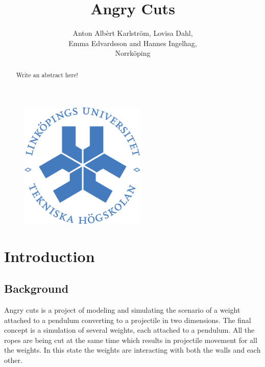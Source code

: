 \documentclass[a4paper,12pt,twoside,english]{article}
\title{Angry Cuts}
\author{Anton Alb\`{e}rt Karlstr\"{o}m, Lovisa Dahl, \\Emma Edvardsson
 and Hannes Ingelhag, \\Norrk\"{o}ping}
\begin{document}


\begin{figure}
\begin{center}
\includegraphics[width=6cm]{bilder/LiTH_sigill_col.png} 
\end{center}
\end{figure}

\maketitle
{}

\newpage
\begin{abstract}
Write an abstract here!
\vfill
\end{abstract}


\newpage

\pagestyle{plain}


\setcounter{page}{1}
\section{Introduction}
\subsection{Background}
Angry cuts is a project of modeling and simulating the scenario of a weight attached to a pendulum converting to a projectile in two dimensions. 
The final concept is a simulation of several weights, each attached to a pendulum. All the ropes are being cut at the same time which results in projectile movement for all the weights. In this state the weights are interacting with both the walls and each other.
\end{document}
